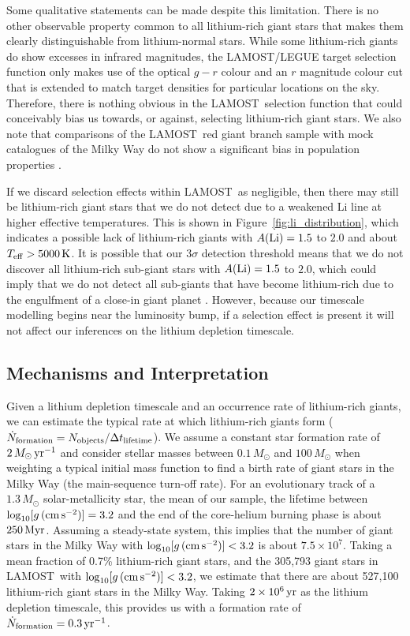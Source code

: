\documentclass[twocolumn]{aastex62}
\newcommand\lamost{LAMOST}
\newcommand{\logg}{\log_{10}[g\,({\rm cm\,s}^{-2})]}
\begin{document}
Some qualitative statements can be made despite this limitation. There
is no other observable property common to all lithium-rich giant stars that makes
them clearly distinguishable from lithium-normal stars. While some
lithium-rich giants do show excesses in infrared magnitudes, the LAMOST/LEGUE 
target selection function \citep{Carlin_2012} only makes use of the optical $g-r$
colour and an $r$ magnitude colour cut that is extended to match target 
densities for particular locations on the sky. Therefore, there is nothing
obvious in the \lamost\ selection function that could conceivably bias us towards,
or against, selecting lithium-rich giant stars. We also note that comparisons of 
the \lamost\ red giant branch sample with mock catalogues of the Milky Way 
do not show a significant bias in population properties \citep{Liu_2017}.


If we discard selection effects within \lamost\ as negligible, then there may still
be lithium-rich giant stars that we do not detect due to a weakened Li 
line at higher effective temperatures. This is shown in Figure~\ref{fig:li_distribution},
which indicates a possible lack of lithium-rich giants with $A({\rm Li}) = 1.5$ to $2.0$
and about $T_{\rm eff} > 5000\,{\rm K}$. It is possible that our $3\sigma$ detection
threshold means that we do not discover all lithium-rich sub-giant stars with $A({\rm Li}) = 1.5$ to $2.0$, which could imply that we do not detect all sub-giants that have become lithium-rich due to the engulfment of a close-in giant planet \citep{Casey_2016}. However, because our timescale modelling begins near the luminosity bump, if a selection effect is present it will not
affect our inferences on the lithium depletion timescale.

\subsection{Mechanisms and Interpretation}

Given a lithium depletion timescale and an occurrence rate of lithium-rich giants,
we can estimate the typical rate at which lithium-rich giants form 
($\dot N_{\rm{formation}} = N_{\rm{objects}}/\Delta t_{\rm{lifetime}}$). 
We assume a constant star formation rate of $2\,M_\odot\,{\rm yr}^{-1}$ and
consider stellar masses between $0.1\,M_\odot$ and $100\,M_\odot$ when weighting
a typical initial mass function \citep{Kroupa_2001} to find a birth rate of giant stars in the Milky Way (the main-sequence turn-off rate).
For an evolutionary track \citep{Dotter_2016,Choi_2016} of a $1.3\,M_\odot$ 
solar-metallicity star, the mean of our sample, the lifetime between $\logg = 3.2$
and the end of the core-helium burning phase is about $250\,{\rm Myr}$. 
Assuming a steady-state system, this implies that the number of giant stars in the Milky Way with 
$\logg < 3.2$ is about $7.5\times10^7$. Taking a mean fraction of 0.7\% 
lithium-rich giant stars, and the 305,793 giant stars in \lamost\ with 
$\logg < 3.2$, we estimate that there are about 527,100 lithium-rich 
giant stars in the Milky Way.  Taking $2\times10^{6}\,{\rm yr}$ as the 
lithium depletion timescale, this provides us with a formation rate of 
$\dot N_{\rm formation} = 0.3\,{\rm yr}^{-1}$. 
\end{document}
